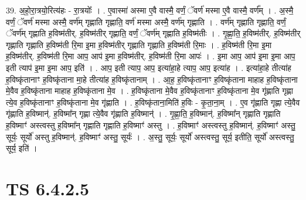 \documentclass[17pt]{extarticle}
\begin{document}
39. अ॒हो॒रा॒त्रयो॒रित्य॑हः - रा॒त्रयोः᳚ । . ए॒वास्मा॑ अस्मा ए॒वै वास्मै॒ वर्णं॒ ॅवर्ण॑ मस्मा ए॒वै वास्मै॒ वर्ण᳚म् । . अ॒स्मै॒ वर्णं॒ ॅवर्ण॑ मस्मा अस्मै॒ वर्ण॑म् गृह्णाति गृह्णाति॒ वर्ण॑ मस्मा अस्मै॒ वर्ण॑म् गृह्णाति । . वर्ण॑म् गृह्णाति गृह्णाति॒ वर्णं॒ ॅवर्ण॑म् गृह्णाति ह॒विष्म॑तीर्. ह॒विष्म॑तीर् गृह्णाति॒ वर्णं॒ ॅवर्ण॑म् गृह्णाति ह॒विष्म॑तीः । . गृ॒ह्णा॒ति॒ ह॒विष्म॑तीर्. ह॒विष्म॑तीर् गृह्णाति गृह्णाति ह॒विष्म॑ती रि॒मा इ॒मा ह॒विष्म॑तीर् गृह्णाति गृह्णाति ह॒विष्म॑ती रि॒माः । . ह॒विष्म॑ती रि॒मा इ॒मा ह॒विष्म॑तीर्. ह॒विष्म॑ती रि॒मा आप॒ आप॑ इ॒मा ह॒विष्म॑तीर्. ह॒विष्म॑ती रि॒मा आपः॑ । . इ॒मा आप॒ आप॑ इ॒मा इ॒मा आप॒ इती त्याप॑ इ॒मा इ॒मा आप॒ इति॑ । . आप॒ इती त्याप॒ आप॒ इत्या॑हा॒हे त्याप॒ आप॒ इत्या॑ह । . इत्या॑हा॒हे तीत्या॑ह ह॒विष्कृ॑तानाꣳ ह॒विष्कृ॑ताना मा॒हे तीत्या॑ह ह॒विष्कृ॑तानाम् । . आ॒ह॒ ह॒विष्कृ॑तानाꣳ ह॒विष्कृ॑ताना माहाह ह॒विष्कृ॑ताना मे॒वैव ह॒विष्कृ॑ताना माहाह ह॒विष्कृ॑ताना मे॒व । . ह॒विष्कृ॑ताना मे॒वैव ह॒विष्कृ॑तानाꣳ ह॒विष्कृ॑ताना मे॒व गृ॑ह्णाति गृह्णा त्ये॒व ह॒विष्कृ॑तानाꣳ ह॒विष्कृ॑ताना मे॒व गृ॑ह्णाति । . ह॒विष्कृ॑ताना॒मिति॑ ह॒विः - कृ॒ता॒ना॒म् । . ए॒व गृ॑ह्णाति गृह्णा त्ये॒वैव गृ॑ह्णाति ह॒विष्मान्॑. ह॒विष्मा᳚न् गृह्णा त्ये॒वैव गृ॑ह्णाति ह॒विष्मान्॑ । . गृ॒ह्णा॒ति॒ ह॒विष्मान्॑. ह॒विष्मा᳚न् गृह्णाति गृह्णाति ह॒विष्माꣳ॑ अस्त्वस्तु ह॒विष्मा᳚न् गृह्णाति गृह्णाति ह॒विष्माꣳ॑ अस्तु । . ह॒विष्माꣳ॑ अस्त्वस्तु ह॒विष्मान्॑. ह॒विष्माꣳ॑ अस्तु॒ सूर्यः॒ सूर्यो॑ अस्तु ह॒विष्मान्॑. ह॒विष्माꣳ॑ अस्तु॒ सूर्यः॑ । . अ॒स्तु॒ सूर्यः॒ सूर्यो॑ अस्त्वस्तु॒ सूर्य॒ इतीति॒ सूर्यो॑ अस्त्वस्तु॒ सूर्य॒ इति॑ । \newline
\pagebreak
{}

\section{ TS 6.4.2.5 }
\end{document}
